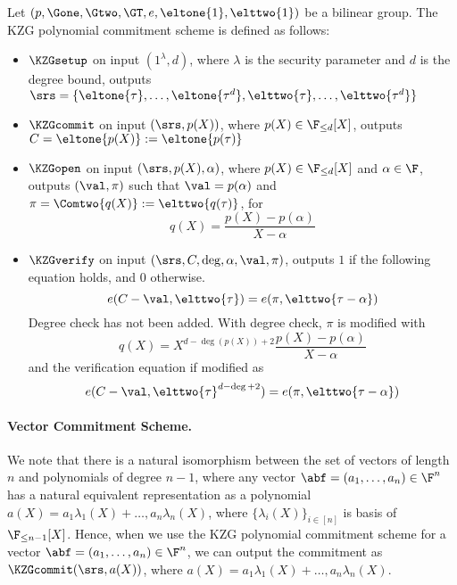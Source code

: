 \begin{definition}
    Let $(p,\Gone,\Gtwo,\GT, e, \eltone{1},\elttwo{1})$ be a bilinear group. The KZG polynomial commitment scheme is defined as follows: 
    \begin{itemize}
	        \item $\KZGsetup$ on input $(1^\lambda,d)$, where $\lambda$ is the security parameter and $d$ is the degree bound, outputs $\srs = \{ \eltone{\tau},\ldots,\eltone{\tau^d},\elttwo{\tau},\ldots,\elttwo{\tau^d}\}$
	        \item $\KZGcommit$ on input $(\srs,p(X))$, where $p(X) \in \F_{\leq d}[X]$, outputs $C=\eltone{p(X)}:=\eltone{p(\tau)}$
	        \item $\KZGopen$ on input $(\srs,p(X),\alpha)$, where $p(X) \in \F_{\leq d}[X]$ and $\alpha\in \F$, outputs $(\val, \pi)$ such that $\val=p(\alpha)$ and $\pi=\Comtwo{q(X)}:=\elttwo{q(\tau)}$, for
	        \[ q(X)=\frac{p(X)-p(\alpha)}{X-\alpha} \]
	        \item $\KZGverify$ on input $(\srs,C,\deg,\alpha,\val,\pi)$, outputs $1$ if the following equation holds, and $0$ otherwise.
	        \[ e(C-\val, \elttwo{\tau}) = e(\pi, \elttwo{\tau-\alpha}) \]
	        { \color{teal} 
		        Degree check has not been added. With degree check, $\pi$ is modified with
		        \[ q(X)=X^{d-\deg(p(X))+2}\frac{p(X)-p(\alpha)}{X-\alpha} \]
		        and the verification equation if modified as 
		        \[ e(C-\val, \elttwo{\tau}^{d-\deg+2}) = e(\pi, \elttwo{\tau-\alpha}) \]
		        } %
	    \end{itemize}
\end{definition}

\paragraph{Vector Commitment Scheme.} We note that there is a natural isomorphism between the set of vectors of length $n$ and polynomials of degree $n-1$, where any vector $\abf=(a_1,\ldots,a_n) \in \F^n$ has a natural equivalent representation as a polynomial $a(X)=a_1\lambda_1(X)+\ldots,a_n\lambda_n(X)$, where $\{\lambda_i(X)\}_{i\in [n]}$ is basis of $\F_{\leq n-1}[X]$. Hence, when we use the KZG polynomial commitment scheme for a vector $\abf=(a_1,\ldots,a_n) \in \F^n$, we can output the commitment as $\KZGcommit(\srs,a(X))$, where $a(X)=a_1\lambda_1(X)+\ldots,a_n\lambda_n(X)$.


